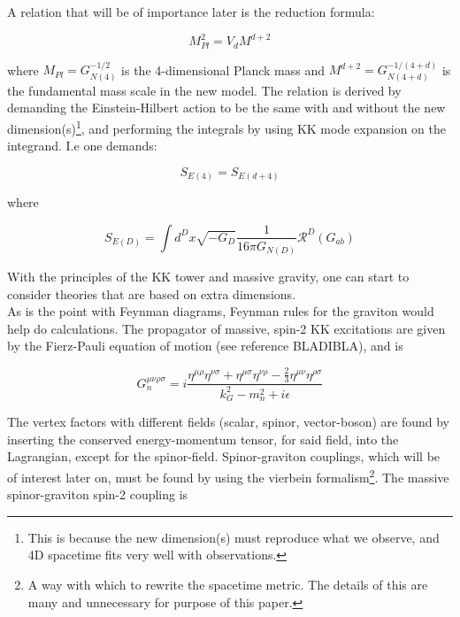 \documentclass[11pt,a4paper]{article}
\begin{document}
A relation that will be of importance later is the reduction formula:

\begin{equation}
	M_{Pl}^2 = V_dM^{d+2}
	\label{eq:red_form}
\end{equation}

where $M_{Pl} = G_{N(4)}^{-1/2}$ is the 4-dimensional Planck mass and $M^{d+2} = G_{N(4+d)}^{-1/(4+d)}$ is the fundamental mass scale in the new model. The relation is derived by demanding the Einstein-Hilbert action to be the same with and without the new dimension(s)\footnote{This is because the new dimension(s) must reproduce what we observe, and 4D spacetime fits very well with observations.}, and performing the integrals by using KK mode expansion on the integrand. I.e one demands:

\begin{equation}
	S_{E(4)} = S_{E(d+4)}
	\label{eq:requirement_for_reduction}
\end{equation}

where

\begin{equation}
	S_{E(D)} = \int d^D x\sqrt{-G_D} \frac{1}{16\pi G_{N(D)}}\mathcal{R}^{D}(G_{ab})
\end{equation}

With the principles of the KK tower and massive gravity, one can start to consider theories that are based on extra dimensions.\\
As is the point with Feynman diagrams, Feynman rules for the graviton would help do calculations. The propagator of massive, spin-2 KK excitations are given by the Fierz-Pauli equation of motion (see reference BLADIBLA), and is

\begin{equation}
	G_n^{\mu\nu\rho\sigma} = i\frac{\eta^{\mu\rho}\eta^{\nu\sigma} + \eta^{\mu\sigma}\eta^{\nu\rho} - \frac{2}{3}\eta^{\mu\nu}\eta^{\rho\sigma}}{k_G^2 - m_n^2 + i\epsilon}
	\label{eq:Gprop}
\end{equation}

The vertex factors with different fields (scalar, spinor, vector-boson) are found by inserting the conserved energy-momentum tensor, for said field, into the Lagrangian, except for the spinor-field. Spinor-graviton couplings, which will be of interest later on, must be found by using the vierbein formalism\footnote{A way with which to rewrite the spacetime metric. The details of this are many and unnecessary for purpose of this paper.}. The massive spinor-graviton spin-2 coupling is
\end{document}
